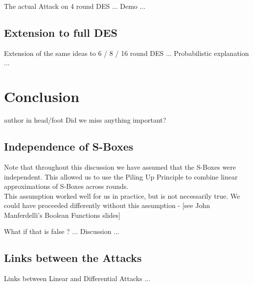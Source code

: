 \documentclass[9pt]{beamer}
\begin{document}
\begin{frame}
The actual Attack on 4 round DES ... Demo ...
\end{frame}

\subsection{Extension to full DES}
\begin{frame}
Extension of the same ideas to 6 / 8 / 16 round DES ... Probabilistic explanation ...

\end{frame}


\section{Conclusion}
\begin{frame}
\begin{beamercolorbox}[ht=2.5ex,dp=1.125ex,center,rounded=true,shadow=true]{author in head/foot}
Did we miss anything important?
\end{beamercolorbox}
\end{frame}

\subsection{Independence of S-Boxes}
\begin{frame}
Note that throughout this discussion we have assumed that the S-Boxes were independent. This allowed us to use the Piling Up Principle to combine linear approximations of S-Boxes across rounds. \\
\vspace{3mm}
This assumption worked well for us in practice, but is not necessarily true. We could have proceeded differently without this assumption - [see John Manferdelli's Boolean Functions slides]
\end{frame}

\begin{frame}
What if that is false ? ... Discussion ...

\end{frame}

\subsection{Links between the Attacks}
\begin{frame}
Links between Linear and Differential Attacks ...

\end{frame}
\end{document}
